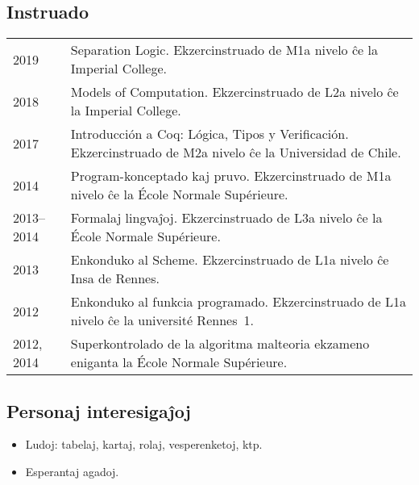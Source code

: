 \documentclass[12pt,a4paper]{article}
\makeatletter
\newcommand{\en}[1]{\foreignlanguage{english}{{#1}}}
\newcommand{\fr}[1]{\foreignlanguage{french}{{#1}}}
\newcommand{\es}[1]{\foreignlanguage{spanish}{{#1}}}
\newcommand{\en}[1]{\foreignlanguage{english}{{#1}}}
\newcommand{\fr}[1]{\foreignlanguage{french}{{#1}}}
\newcommand{\es}[1]{\foreignlanguage{spanish}{{#1}}}
\newenvironment{datecvsection}[1]%
               {\subsection*{#1}%
                 \noindent \begin{tabular}{@{}p{\annee}p{\texte}@{}}}
               {\end{tabular}}
\newenvironment{itemcvsection}[1]%
               {\subsection*{#1}\begin{itemize}}
               {\end{itemize}}
\newcommand\placeName{}
\makeatother
\begin{document}
\begin{datecvsection}{Instruado}

    2019 & Separation Logic. Ekzercinstruado de M1a nivelo ĉe la \en{\placeName{Imperial College}}. \\

    2018 & Models of Computation. Ekzercinstruado de L2a nivelo ĉe la \en{\placeName{Imperial College}}. \\

    2017 & Introducción a Coq: Lógica, Tipos y Verificación. Ekzercinstruado de M2a nivelo ĉe la \es{\placeName{Universidad de Chile}}. \\

    2014 & Program-konceptado kaj pruvo. Ekzercinstruado de M1a nivelo ĉe la \fr{\placeName{École Normale Supérieure}}. \\

    2013–2014 & Formalaj lingvaĵoj. Ekzercinstruado de L3a nivelo ĉe la \fr{\placeName{École Normale Supérieure}}. \\

    2013 & Enkonduko al Scheme. Ekzercinstruado de L1a nivelo ĉe \placeName{Insa} de \placeName{Rennes}. \\

    2012 & Enkonduko al funkcia programado. Ekzercinstruado de L1a nivelo ĉe la \fr{université \placeName{Rennes}~1}. \\

    2012, 2014 & Superkontrolado de la algoritma malteoria ekzameno eniganta la \fr{\placeName{École Normale Supérieure}}.

\end{datecvsection}

\begin{itemcvsection}{Personaj interesigaĵoj}

  \item Ludoj: tabelaj, kartaj, rolaj, vesperenketoj, ktp.
  \item Esperantaj agadoj.

\end{itemcvsection}
\end{document}
